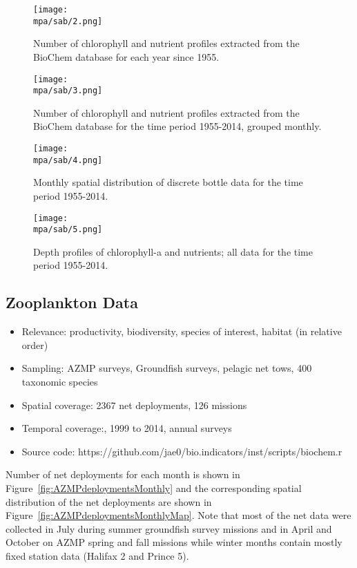 \documentclass[letterpaper,portrait,11pt]{scrartcl}
\numberwithin{equation}{section}		%
\numberwithin{figure}{section}		%
\numberwithin{table}{section}				%
\newcommand*{\D}{.}
\newcommand{\biodata}{\string~/bio\D data}   %
\newcommand{\mpa}{\biodata/bio\D indicators/mpa}  %
\begin{document}
\begin{figure}
  \centering
  \texttt{[image: \\mpa/sab/2.png]}
  \caption{Number of chlorophyll and nutrient profiles extracted from the BioChem database for each year since 1955.}
    \label{fig:ChloroMap}
\end{figure}

\begin{figure}
  \centering
  \texttt{[image: \\mpa/sab/3.png]}
  \caption{Number of chlorophyll and nutrient profiles extracted from the BioChem database for the time period 1955-2014, grouped monthly.}
    \label{fig:ChloroFreq}
\end{figure}

\begin{figure}[h]
  \centering
  \texttt{[image: \\mpa/sab/4.png]}
  \caption{Monthly spatial distribution of discrete bottle data for the time period 1955-2014.}
   \label{fig:BottleMap}
\end{figure}

\begin{figure}
  \centering
  \texttt{[image: \\mpa/sab/5.png]}
  \caption{Depth profiles of chlorophyll-a and nutrients; all data for the time period 1955-2014.}
    \label{fig:ChloroProfiles}
\end{figure}


\subsection{Zooplankton Data}

\begin{itemize}  
  \item Relevance:  productivity, biodiversity, species of interest, habitat (in relative order)
  \item Sampling:  AZMP surveys, Groundfish surveys, pelagic net tows, 400 taxonomic species
  \item Spatial coverage: 2367 net deployments, 126 missions 
  \item Temporal coverage:,  1999 to 2014, annual surveys
  \item Source code: https://github.com/jae0/bio.indicators/inst/scripts/biochem.r
\end{itemize}

Number of net deployments for each month is shown in Figure~\ref{fig:AZMPdeploymentsMonthly} and the corresponding spatial distribution of the net deployments are shown in Figure~\ref{fig:AZMPdeploymentsMonthlyMap}. Note that most of the net data were collected in July during summer groundfish survey missions and in April and October on AZMP spring and fall missions while winter months contain mostly fixed station data (Halifax 2 and Prince 5).
\end{document}
